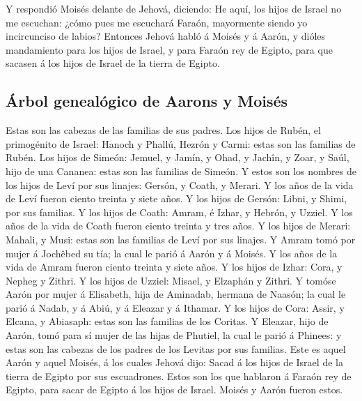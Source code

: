  Y respondió Moisés delante de Jehová, diciendo: He aquí,
los hijos de Israel no me escuchan: ¿cómo pues me escuchará Faraón,
mayormente siendo yo incircunciso de labios?  Entonces
Jehová habló á Moisés y á Aarón, y dióles mandamiento para los hijos de
Israel, y para Faraón rey de Egipto, para que sacasen á los hijos de
Israel de la tierra de Egipto.

\hypertarget{uxe1rbol-genealuxf3gico-de-aarons-y-moisuxe9s}{%
\subsection{Árbol genealógico de Aarons y
Moisés}\label{uxe1rbol-genealuxf3gico-de-aarons-y-moisuxe9s}}

 Estas son las cabezas de las familias de sus padres. Los
hijos de Rubén, el primogénito de Israel: Hanoch y Phallú, Hezrón y
Carmi: estas son las familias de Rubén.  Los hijos de
Simeón: Jemuel, y Jamín, y Ohad, y Jachîn, y Zoar, y Saúl, hijo de una
Cananea: estas son las familias de Simeón.  Y estos son
los nombres de los hijos de Leví por sus linajes: Gersón, y Coath, y
Merari. Y los años de la vida de Leví fueron ciento treinta y siete
años.  Y los hijos de Gersón: Libni, y Shimi, por sus
familias.  Y los hijos de Coath: Amram, é Izhar, y
Hebrón, y Uzziel. Y los años de la vida de Coath fueron ciento treinta y
tres años.  Y los hijos de Merari: Mahali, y Musi: estas
son las familias de Leví por sus linajes.  Y Amram tomó
por mujer á Jochêbed su tía; la cual le parió á Aarón y á Moisés. Y los
años de la vida de Amram fueron ciento treinta y siete años.
 Y los hijos de Izhar: Cora, y Nepheg y Zithri.
 Y los hijos de Uzziel: Misael, y Elzaphán y Zithri.
 Y tomóse Aarón por mujer á Elisabeth, hija de Aminadab,
hermana de Naasón; la cual le parió á Nadab, y á Abiú, y á Eleazar y á
Ithamar.  Y los hijos de Cora: Assir, y Elcana, y
Abiasaph: estas son las familias de los Coritas.  Y
Eleazar, hijo de Aarón, tomó para sí mujer de las hijas de Phutiel, la
cual le parió á Phinees: y estas son las cabezas de los padres de los
Levitas por sus familias.  Este es aquel Aarón y aquel
Moisés, á los cuales Jehová dijo: Sacad á los hijos de Israel de la
tierra de Egipto por sus escuadrones.  Estos son los que
hablaron á Faraón rey de Egipto, para sacar de Egipto á los hijos de
Israel. Moisés y Aarón fueron estos.

